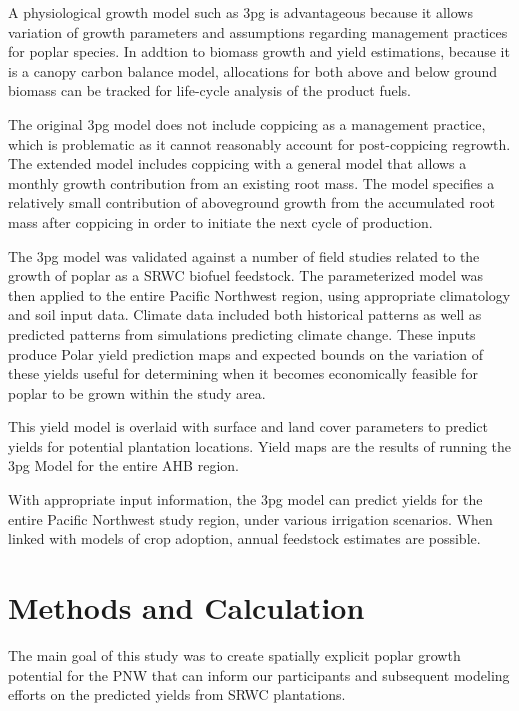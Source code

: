 \documentclass[preprint,12pt]{elsarticle}
\begin{document}
A physiological growth model such as \ac{3pg} is advantageous because
it allows variation of growth parameters and assumptions regarding
management practices for poplar species.  In addtion to biomass growth
and yield estimations, because it is a canopy carbon balance model,
allocations for both above and below ground biomass can be tracked for
life-cycle analysis of the product fuels.

The original \ac{3pg} model does not include coppicing as a management
practice, which is problematic as it cannot reasonably account for
post-coppicing regrowth.  The extended model includes coppicing with a
general model that allows a monthly growth contribution from an
existing root mass.  The model specifies a relatively small
contribution of aboveground growth from the accumulated root mass
after coppicing in order to initiate the next cycle of production.

The \ac{3pg} model was validated against a number of field studies
related to the growth of poplar as a \ac{SRWC} biofuel feedstock.  The
parameterized model was then applied to the entire Pacific Northwest
region, using appropriate climatology and soil input data.  Climate
data included both historical patterns as well as predicted patterns
from simulations predicting climate change.  These inputs produce
Polar yield prediction maps and expected bounds on the variation of
these yields useful for determining when it becomes economically
feasible for poplar to be grown within the study area. 

This yield model is overlaid with surface and land cover
parameters to predict yields for potential plantation locations.
Yield maps are the results of running the \ac{3pg} Model for the
entire \ac{AHB} region. 

With appropriate input information, the \ac{3pg} model can predict
yields for the entire Pacific Northwest study region, under various
irrigation scenarios.  When linked with models of crop adoption,
annual feedstock estimates are possible.

\section{Methods and Calculation}

The main goal of this study was to create spatially explicit poplar
growth potential for the \ac{PNW} that can inform our participants and
subsequent modeling efforts on the predicted yields from \ac{SRWC}
plantations.
\end{document}
